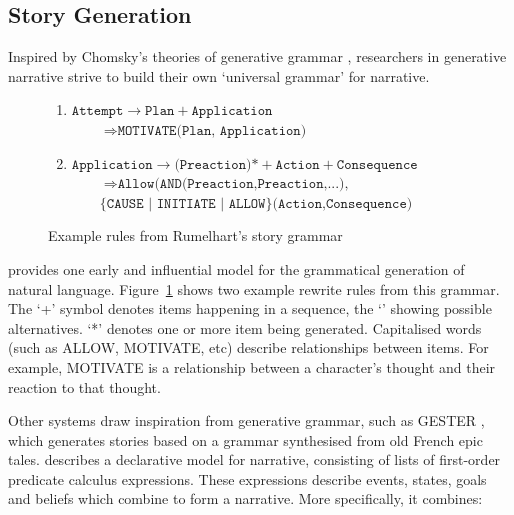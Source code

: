 \documentclass[11pt]{report}
\begin{document}
\subsection{Story Generation}
Inspired by Chomsky's theories of generative grammar \citep{chomsky1968sound}, researchers in generative narrative strive to build their own `universal grammar' for narrative.

\begin{figure}[!t]
  \begin{center}
  \begin{enumerate}
    \item $\texttt{Attempt}\rightarrow \texttt{Plan} + \texttt{Application}$\\
           $\qquad\Rightarrow\texttt{MOTIVATE(Plan, Application)}$
    \item $\texttt{Application}\rightarrow\texttt{(Preaction)*} + \texttt{Action} + \texttt{Consequence}$\\
           $\qquad\Rightarrow\texttt{Allow(AND(Preaction,Preaction,...),}$\\
           $\qquad\{\texttt{CAUSE | INITIATE | ALLOW}\}\texttt{(Action,Consequence)}$
  \end{enumerate}
  \end{center}

  \caption{Example rules from Rumelhart's story grammar}\label{fig:rumelhart}
\end{figure}

\citet{rumelhart1975notes} provides one early and influential model for the grammatical generation of natural language. Figure~\ref{fig:rumelhart} shows two example rewrite rules from this grammar. The `+' symbol denotes items happening in a sequence, the `\textbar' showing possible alternatives. `*' denotes one or more item being generated. Capitalised words (such as ALLOW, MOTIVATE, etc) describe relationships between items. For example, MOTIVATE is a relationship between a character's thought and their reaction to that thought.

Other systems draw inspiration from generative grammar, such as GESTER \citep{pemberton1989modular}, which generates stories based on a grammar synthesised from old French epic tales. \citet{lang1999declarative} describes a declarative model for narrative, consisting of lists of first-order predicate calculus expressions. These expressions describe events, states, goals and beliefs which combine to form a narrative. More specifically, it combines:
\end{document}
